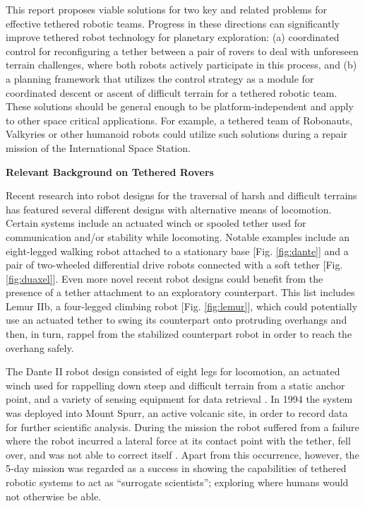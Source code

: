 \documentclass[12pt]{article}
\begin{document}
 This report proposes viable solutions for
two key and related problems for effective tethered robotic teams.
Progress in these directions can significantly improve tethered robot 
technology for
planetary exploration: (a) coordinated control for reconfiguring a
tether between a pair of rovers to deal with unforeseen terrain
challenges, where both robots actively participate in this process,
and (b) a planning framework that utilizes the control strategy as a
module for coordinated descent or ascent of difficult terrain for a
tethered robotic team.  These solutions should be general enough to
be platform-independent and apply to other space critical
applications. For example, a tethered team of Robonauts, Valkyries or
other humanoid robots could utilize such solutions during a repair
mission of the International Space Station.


{\bf\noindent Relevant Background on Tethered Rovers}

Recent research into robot designs for the traversal of harsh and
difficult terrains has featured several different designs with
alternative means of locomotion. Certain systems include an actuated
winch or spooled tether used for communication and/or stability while
locomoting.  Notable examples include an eight-legged walking robot
attached to a stationary base [Fig. \ref{fig:dante}] and a pair of
two-wheeled differential drive robots connected with a soft tether
[Fig. \ref{fig:duaxel}]. Even more novel recent robot designs could
benefit from the presence of a tether attachment to an exploratory
counterpart. This list includes Lemur IIb, a four-legged climbing
robot [Fig. \ref{fig:lemur}], which could potentially use an actuated
tether to swing its counterpart onto protruding overhangs and then, in
turn, rappel from the stabilized counterpart robot in order to reach
the overhang safely.


The Dante II robot design consisted of eight legs for locomotion, an actuated 
winch used for rappelling down steep and difficult terrain
from a static anchor point, and a variety of sensing equipment for data 
retrieval \cite{dante_design}.  
In 1994 the system was deployed into Mount Spurr, an active
volcanic site, in order to record data for further scientific
analysis. During the mission the robot suffered from a
failure where the robot incurred a lateral force at its contact point
with the tether, fell over, and was not able to correct itself \cite{dante_results}. Apart
from this occurrence, however, the 5-day mission was regarded as a
success in showing the capabilities of tethered robotic systems to act
as ``surrogate scientists''; exploring where humans would not
otherwise be able.
\end{document}
